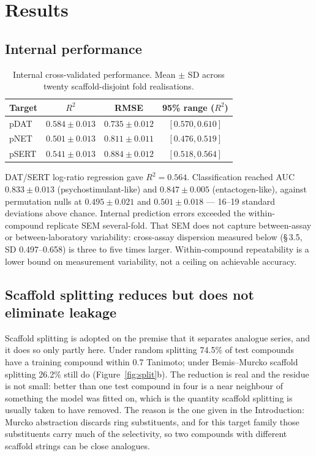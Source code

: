 \documentclass[11pt,a4paper]{article}
\begin{document}
\FloatBarrier
\section{Results}

\subsection{Internal performance}

\begin{table}[tb]
\centering
\small
\caption{Internal cross-validated performance. Mean $\pm$ SD across twenty
scaffold-disjoint fold realisations.}
\label{tab:internal}
\begin{tabular}{lccc}
\toprule
Target & $R^2$ & RMSE & 95\% range ($R^2$) \\
\midrule
pDAT  & $0.584\pm0.013$ & $0.735\pm0.012$ & $[0.570,0.610]$ \\
pNET  & $0.501\pm0.013$ & $0.811\pm0.011$ & $[0.476,0.519]$ \\
pSERT & $0.541\pm0.013$ & $0.884\pm0.012$ & $[0.518,0.564]$ \\
\bottomrule
\end{tabular}
\end{table}

DAT/SERT log-ratio regression gave $R^2=0.564$. Classification reached AUC
$0.833\pm0.013$ (psychostimulant-like) and $0.847\pm0.005$ (entactogen-like), against
permutation nulls at $0.495\pm0.021$ and $0.501\pm0.018$ --- 16--19 standard deviations
above chance. Internal prediction errors exceeded the within-compound replicate SEM
several-fold. That SEM does not capture between-assay or between-laboratory
variability: cross-assay dispersion measured below (\S\,3.5, SD 0.497--0.658) is
three to five times larger. Within-compound repeatability is a lower bound on
measurement variability, not a ceiling on achievable accuracy.

\subsection{Scaffold splitting reduces but does not eliminate leakage}
\label{sec:scaffold-leak}

Scaffold splitting is adopted on the premise that it separates analogue series, and it
does so only partly here. Under random splitting 74.5\% of test compounds have a training
compound within 0.7 Tanimoto; under Bemis--Murcko scaffold splitting 26.2\% still do
(Figure~\ref{fig:split}b). The reduction is real and the residue is not small: better
than one test compound in four is a near neighbour of something the model was fitted on,
which is the quantity scaffold splitting is usually taken to have removed. The reason is
the one given in the Introduction: Murcko abstraction discards ring substituents, and
for this target family those substituents carry much of the selectivity, so two compounds
with different scaffold strings can be close analogues.
\end{document}
